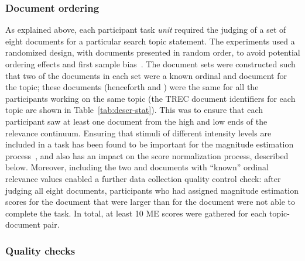 \subsubsection{Document ordering}
\label{sec:document-ordering}

As explained above, each participant
task \emph{unit} required the judging of a set of eight documents for a particular search
topic statement.
The experiments used a randomized design, with documents presented in
random order, to avoid potential ordering effects and first sample
bias~\cite{moskowitz:1977}.
The document sets were constructed such that two of the documents in
each set were a known ordinal \hh and \nn document for the topic;
%
these documents %
(henceforth \hkh and \nkn) were the same for all 
the participants working on the same topic 
(the TREC document identifiers for each
topic are shown in Table~\ref{tab:descr-stat}).
This was to ensure that each participant saw at least one document from
the high and low ends of the relevance continuum.
Ensuring that stimuli of different intensity levels are included in a
task has been found to be important for the magnitude estimation
process~\cite{Ges97}, and also has an impact on the score normalization
process, described below.
Moreover, including the two \nkn and \hkh documents with ``known'' ordinal relevance
values enabled a further data collection quality control check: after
judging all eight documents, participants who had assigned magnitude
estimation scores for the \nkn document that were larger than for the
\hkh document were not able to complete the task.
In total, at least 10 ME scores were gathered for each topic-document
pair.

\subsubsection{Quality checks}
\label{sec:quality-checks}

